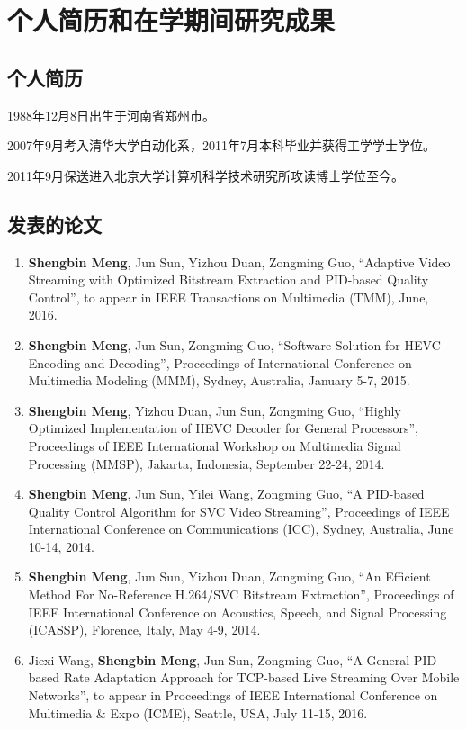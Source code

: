 \chapter{个人简历和在学期间研究成果}

\section*{个人简历}

1988年12月8日出生于河南省郑州市。

2007年9月考入清华大学自动化系，2011年7月本科毕业并获得工学学士学位。

2011年9月保送进入北京大学计算机科学技术研究所攻读博士学位至今。

\renewcommand{\labelenumi}{[\arabic{enumi}]}

\section*{发表的论文}
\begin{enumerate}
	\item \textbf{Shengbin Meng}, Jun Sun, Yizhou Duan, Zongming Guo, ``Adaptive Video Streaming with Optimized Bitstream Extraction and PID-based Quality Control'', to appear in IEEE Transactions on Multimedia (TMM), June, 2016.
	\item \textbf{Shengbin Meng}, Jun Sun, Zongming Guo, ``Software Solution for HEVC Encoding and Decoding'', Proceedings of International Conference on Multimedia Modeling (MMM), Sydney, Australia, January 5-7, 2015.
	\item \textbf{Shengbin Meng}, Yizhou Duan, Jun Sun, Zongming Guo, ``Highly Optimized Implementation of HEVC Decoder for General Processors'', Proceedings of IEEE International Workshop on Multimedia Signal Processing (MMSP), Jakarta, Indonesia, September 22-24, 2014.
	\item \textbf{Shengbin Meng}, Jun Sun, Yilei Wang, Zongming Guo, ``A PID-based Quality Control Algorithm for SVC Video Streaming'', Proceedings of IEEE International Conference on Communications (ICC), Sydney, Australia, June 10-14, 2014.
	\item \textbf{Shengbin Meng}, Jun Sun, Yizhou Duan, Zongming Guo, ``An Efficient Method For No-Reference H.264/SVC Bitstream Extraction'', Proceedings of IEEE International Conference on Acoustics, Speech, and Signal Processing (ICASSP), Florence, Italy, May 4-9, 2014.
	\item Jiexi Wang, \textbf{Shengbin Meng}, Jun Sun, Zongming Guo, ``A General PID-based Rate Adaptation Approach for TCP-based Live Streaming Over Mobile Networks'', to appear in Proceedings of IEEE International Conference on Multimedia \& Expo (ICME), Seattle, USA, July 11-15, 2016.
\end{enumerate}

